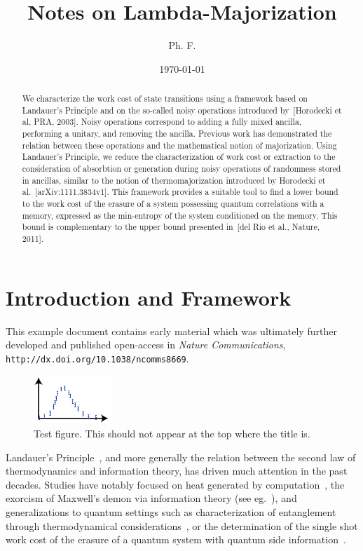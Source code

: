 \documentclass[12pt,a4paper]{article}
\title{Notes on Lambda-Majorization}
\author{Ph. F.}
\date{\today}
\providecommand\url\texttt
\def\noteabstracttextfont{\small\itshape}
\begin{document}
\maketitle

\begin{abstract}
  We characterize the work cost of state transitions using a framework based on Landauer's Principle and
  on the so-called noisy operations introduced by~[Horodecki et al, PRA, 2003]. Noisy operations correspond to
  adding a fully mixed ancilla, performing a unitary, and removing the ancilla. Previous work has demonstrated
  the relation between these operations and the mathematical notion of majorization. Using Landauer's Principle,
  we reduce the characterization of work cost or extraction to the consideration of absorbtion or generation
  during noisy operations of randomness stored in ancillas, similar to the notion of thermomajorization introduced
  by Horodecki et al.~[arXiv:1111.3834v1]. This framework provides a
  suitable tool to find a lower bound to the work cost of the erasure of a system possessing quantum
  correlations with a memory, expressed as the min-entropy of the system conditioned on the memory. This
  bound is complementary to the upper bound presented in~[del Rio et al., Nature, 2011].
\end{abstract}


\inlinetoc

\section{Introduction and Framework}

This example document contains early material which was ultimately further developed and
published open-access in \emph{Nature Communications},
\url{http://dx.doi.org/10.1038/ncomms8669}.

\begin{figure}[t]
  \centering
  \includegraphics[width=3cm]{testfigure}
  \caption{Test figure. This should not appear at the top where the title is.}
  \label{fig:test}
\end{figure}

Landauer's Principle~\cite{Landauer1961_5392446Erasure}, and more generally the relation between the second law
of thermodynamics and information theory, has driven much attention in the past decades. Studies have notably
focused on heat generated by computation~\cite{Bennett1982IJTP_ThermodynOfComp}, the exorcism of Maxwell's demon
via information theory (see eg.~\cite{Bennett2003_NotesLP}), and generalizations to quantum settings such as
characterization of entanglement through thermodynamical
considerations~\cite{Oppenheim2002PRL_thermodynamical}, or the determination of the single shot work cost of
the erasure of a quantum system with quantum side information~\cite{delRio2011Nature}.
\end{document}

